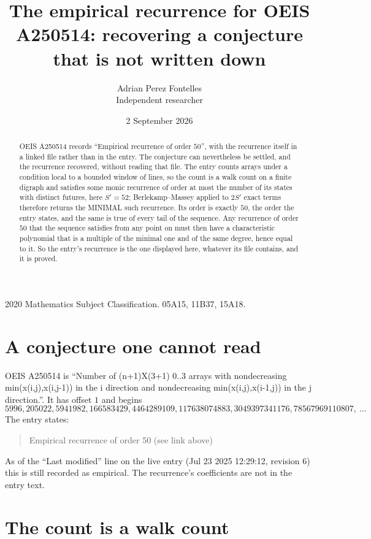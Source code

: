\documentclass[11pt,a4paper]{article}
\title{The empirical recurrence for OEIS A250514: recovering a conjecture that is not written down}
\author{Adrian Perez Fontelles\\ \small Independent researcher}
\date{2 September 2026}
\theoremstyle{plain}
\theoremstyle{definition}
\begin{document}
\maketitle

\begin{abstract}
OEIS A250514 records ``Empirical recurrence of order $50$'', with the recurrence itself in a
linked file rather than in the entry. The conjecture can nevertheless be settled, and the
recurrence recovered, without reading that file. The entry counts arrays under a condition
local to a bounded window of lines, so the count is a walk count on a finite digraph and
satisfies some monic recurrence of order at most the number of its states with distinct
futures, here $S'=52$; Berlekamp--Massey applied to $2S'$ exact
terms therefore returns the MINIMAL such recurrence. Its order is exactly $50$, the order
the entry states, and the same is true of every tail of the sequence. Any recurrence of order
$50$ that the sequence satisfies from any point on must then have a characteristic
polynomial that is a multiple of the minimal one and of the same degree, hence equal to it. So
the entry's recurrence is the one displayed here, whatever its file contains, and it is
proved.
\end{abstract}

\noindent\small 2020 Mathematics Subject Classification. 05A15, 11B37, 15A18.\normalsize

\section{A conjecture one cannot read}

OEIS A250514 is ``Number of (n+1)X(3+1) 0..3 arrays with nondecreasing min(x(i,j),x(i,j-1)) in the i direction and nondecreasing min(x(i,j),x(i-1,j)) in the j direction.''. It has offset $1$ and begins
\[
5996, 205022, 5941982, 166583429, 4464289109, 117638074883, 3049397341176, 78567969110807,\ \dots
\]
The entry states:
\begin{quote}
Empirical recurrence of order 50 (see link above)
\end{quote}
As of the ``Last modified'' line on the live entry (Jul 23 2025 12:29:12, revision 6) this is still
recorded as empirical. The recurrence's coefficients are not in the entry text.

\section{The count is a walk count}
\end{document}
